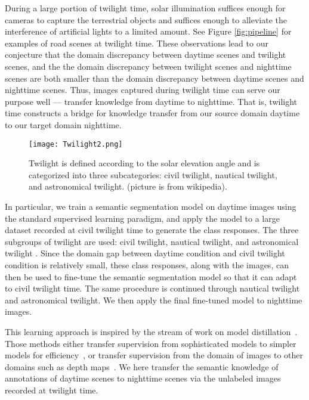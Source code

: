 \documentclass[letterpaper, 10 pt, conference]{ieeeconf}
\begin{document}
During a large portion of twilight time, solar illumination suffices enough for cameras to capture the terrestrial objects and suffices enough to alleviate the interference of artificial lights to a limited amount. See Figure \ref{fig:pipeline} for examples of road scenes at twilight time. These observations lead to our conjecture that the domain discrepancy between daytime scenes and twilight scenes, and the the domain discrepancy between twilight scenes and nighttime scenes are both smaller than the domain discrepancy between daytime scenes and nighttime scenes. Thus, images captured during twilight time can serve our purpose well --- transfer knowledge from daytime to nighttime. That is, twilight time constructs a bridge for knowledge transfer from our source domain daytime to our target domain nighttime. 

\begin{figure}[t]
\centering
\texttt{[image: Twilight2.png]}
\caption{Twilight is defined according to the solar elevation angle and is categorized into three subcategories: civil twilight, nautical twilight, and astronomical twilight. (picture is from wikipedia).}
\label{fig:twillight}
\end{figure}

In particular, we train a semantic segmentation model on daytime images using the standard supervised learning paradigm, and apply the model to a large dataset recorded at civil twilight time to generate the class responses. The three subgroups of twilight are used: civil twilight, nautical twilight, and astronomical twilight \cite{twilight:definition}.  Since the domain gap between daytime condition and civil twilight condition is relatively small, these class responses, along with the images, can then be used to fine-tune the semantic segmentation model so that it can adapt to civil twilight time. The same procedure is continued through nautical twilight and astronomical twilight. We then apply the final fine-tuned model to nighttime images. 

This learning approach is inspired by the stream of work on model distillation~\cite{hinton2015distilling,dai:metric:imitation,supervision:transfer}. Those methods either transfer supervision from sophisticated models to simpler models for efficiency~\cite{hinton2015distilling,dai:metric:imitation}, or transfer supervision from the domain of images to other domains such as depth maps~\cite{supervision:transfer}. We here transfer the semantic knowledge of annotations of daytime scenes to nighttime scenes via  the unlabeled images recorded at twilight time. 
\end{document}
